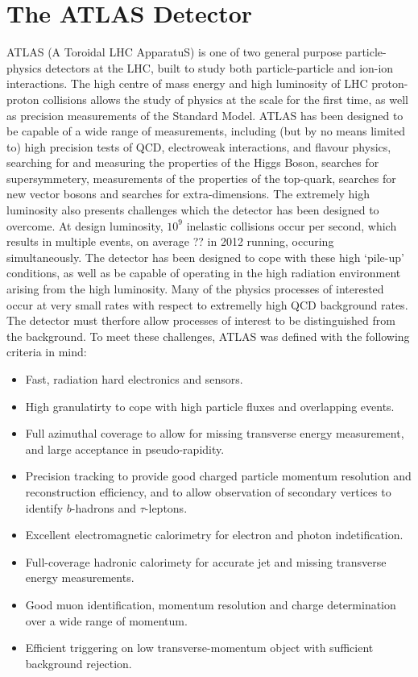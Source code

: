 
\section{The ATLAS Detector}

ATLAS (A Toroidal LHC ApparatuS) is one of two general purpose particle-physics
detectors at the LHC, built to study both particle-particle and ion-ion
interactions. The high centre of mass energy and high luminosity of LHC proton-proton collisions
allows the study of physics at the \tev scale for the first time, as well as
precision measurements of the Standard Model. ATLAS has been designed to be
capable of a wide range of measurements, including (but by no means limited to)
high precision tests of QCD, electroweak interactions, and flavour physics, searching for and measuring
the properties of the Higgs Boson, searches for supersymmetery, measurements
of the properties of the top-quark, searches for new vector bosons and searches
for extra-dimensions. The extremely high luminosity also presents challenges which
the detector has been designed to overcome. At design luminosity, $10^9$
inelastic collisions occur per second, which results in multiple events, on average ?? in 2012 running, occuring
simultaneously. The detector has been designed to cope with these high
`pile-up' conditions, as well as be capable of operating in the high radiation
environment arising from the high luminosity. Many of the physics processes of interested occur at very
small rates with respect to extremelly high QCD background rates. The detector
must therfore allow processes of interest to be distinguished from the
background. To meet these challenges, ATLAS was defined with the following
criteria in mind:

\begin{itemize}
\item Fast, radiation hard electronics and sensors.
\item High granulatirty to  cope with high particle fluxes and overlapping events.
\item Full azimuthal coverage to allow for missing transverse energy
measurement, and large acceptance in pseudo-rapidity.
\item Precision tracking to provide good charged particle momentum resolution
and reconstruction efficiency, and to allow observation of secondary vertices to
identify $b$-hadrons and $\tau$-leptons.
\item Excellent electromagnetic calorimetry for electron and photon
indetification.
\item Full-coverage hadronic calorimety for accurate jet and missing transverse
energy measurements.
\item Good muon identification, momentum resolution and charge determination over a wide range of
momentum.
\item Efficient triggering on low transverse-momentum object with sufficient
background rejection.
\end{itemize}

